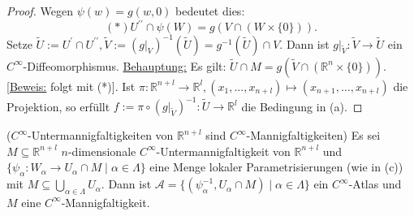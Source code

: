 \documentclass[a4paper,11pt,notitlepage]{report}
\theoremstyle{definition}
\newcommand{\R}{{\ensuremath{\mathbb{R}}}}
\begin{document}
\begin{proof}
		 \newline
		 Wegen $\psi(w)=g(w,0)$ bedeutet dies:
		 $$(*) U^{\prime\prime} \cap \psi(W) = g(V \cap(W \times \{0\})).$$
		 Setze $\tilde{U} := U^\prime \cap U^{\prime\prime}, \tilde{V} := (g \big |_V)^{-1}(\tilde{U}) = g^{-1}(\tilde{U}) \cap V.$
		 Dann ist $g \big |_{\tilde{V}} \colon \tilde{V} \rightarrow \tilde{U}$ ein $C^\infty$-Diffeomorphismus.
		 \newline
		 \underline{Behauptung:} Es gilt: $\tilde{U} \cap M = g(\tilde{V} \cap (\R^n \times \{0\}))$. 
		 \newline
		 \underline{[Beweis:} folgt mit (*)].
		 \newline
		 Ist $\pi \colon \R^{n+l} \rightarrow \R^l, (x_1, \ldots, x_{n+l}) \mapsto (x_{n+1}, \ldots, x_{n+l})$ die Projektion, so erfüllt $f := \pi \circ (g \big |_{\tilde{V}})^{-1} \colon \tilde{U} \rightarrow \R^l$ die Bedingung in (a).
\end{proof}

\begin{theorem}{($C^\infty$-Untermannigfaltigkeiten von $\R^{n+l}$ sind $C^\infty$-Mannigfaltigkeiten)}
	Es sei $M \subseteq \R^{n+l}$ $n$-dimensionale $C^\infty$-Untermannigfaltigkeit von $\R^{n+l}$ und $\{\psi_\alpha \colon W_\alpha \rightarrow U_\alpha \cap M \mid \alpha \in \Lambda\}$ eine Menge lokaler Parametrisierungen (wie in (c)) mit $M \subseteq \bigcup\limits_{\alpha \in \Lambda}{U_\alpha}$.
	Dann ist $\mathcal{A} = \{(\psi_\alpha^{-1}, U_\alpha \cap M) \mid \alpha \in \Lambda\}$ ein $C^\infty$-Atlas und $M$ eine $C^\infty$-Mannigfaltigkeit.
\end{theorem}

\newpage
\end{document}
